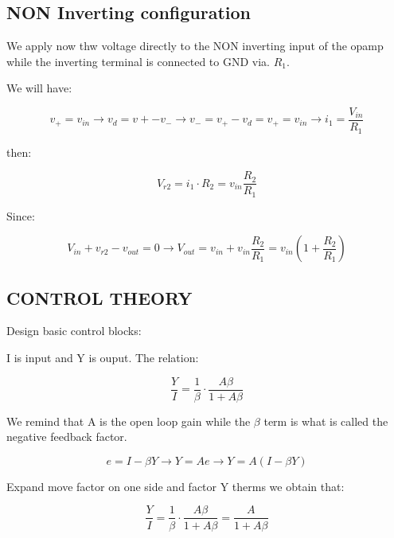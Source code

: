 \documentclass[../main.tex]{subfiles}
\begin{document}
\subsection{NON Inverting configuration}

We apply now thw voltage directly to the NON inverting input of the opamp while the inverting terminal is connected to GND via. $R_1$.\\


\vspace*{7cm}


We will have:

\begin{equation}
	v_+ = v_{in} \rightarrow v_d = v{+} - v_- \rightarrow v_- = v_+ - v_d = v_+ = v_{in} \rightarrow i_1 = \frac{V_{in}}{R_1}
\end{equation}

then:

\begin{equation}
	V_{r2} = i_1 \cdot R_2 = v_{in} \frac{R_2}{R_1}
\end{equation}

Since:

\begin{equation}
	V_{in} + v_{r2} - v_{out} = 0 \rightarrow V_{out} = v_{in} + v_{in} \frac{R_2}{R_1} = v_{in} (1 + \frac{R_2}{R_1})
\end{equation}


\subsection{CONTROL THEORY}

Design basic control blocks:

I is input and Y is ouput.
The relation:

\begin{equation}
	\frac{Y}{I} = \frac{1}{\beta} \cdot \frac{A\beta}{1 + A\beta}
\end{equation}

We remind that A is the open loop gain while the $\beta$ term is what is called the negative feedback factor.

\begin{equation}
	e = I - \beta Y \rightarrow Y = Ae \rightarrow Y = A(I - \beta Y)
\end{equation}

Expand move factor on one side and factor Y therms we obtain that:

\begin{equation}
	\frac{Y}{I} = \frac{1}{\beta} \cdot \frac{A\beta}{1 + A\beta} = \frac{A}{1 + A\beta}
\end{equation}
\end{document}
